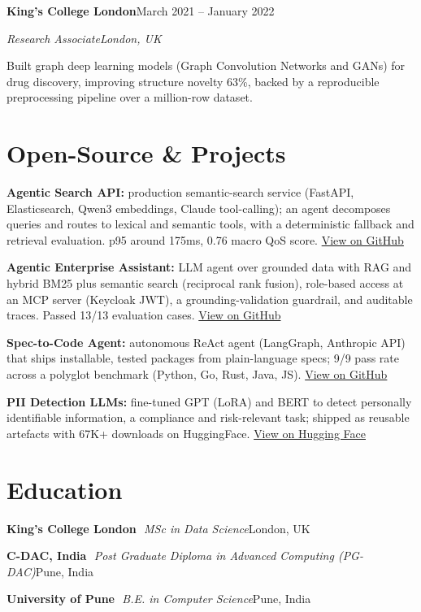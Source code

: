 \documentclass[10pt,a4paper]{article}
\newcommand{\entry}[4]{%
  {\color{company}\bfseries #1}\hfill {\color{muted}#2}\par
  \vspace{1pt}
  {\itshape #3}\hfill {\color{muted}\itshape #4}\par
  \vspace{3pt}%
}
\newcommand{\sep}{\,\textcolor{accent!60}{\textbar}\,}
\begin{document}
\entry{King's College London}{March 2021 -- January 2022}{Research Associate}{London, UK}
\begin{tight}
  \item Built graph deep learning models (Graph Convolution Networks and GANs) for drug discovery, improving structure novelty 63\%, backed by a reproducible preprocessing pipeline over a million-row dataset.
\end{tight}

\section{Open-Source \& Projects}
\begin{tight}
  \item \textbf{Agentic Search API:} production semantic-search service (FastAPI, Elasticsearch, Qwen3 embeddings, Claude tool-calling); an agent decomposes queries and routes to lexical and semantic tools, with a deterministic fallback and retrieval evaluation. p95 around 175ms, 0.76 macro QoS score. \href{https://github.com/abhijeetscode/search-agent}{View on GitHub}
  \item \textbf{Agentic Enterprise Assistant:} LLM agent over grounded data with RAG and hybrid BM25 plus semantic search (reciprocal rank fusion), role-based access at an MCP server (Keycloak JWT), a grounding-validation guardrail, and auditable traces. Passed 13/13 evaluation cases. \href{https://github.com/abhijeetscode/Agentic-Enterprise-Assistant}{View on GitHub}
  \item \textbf{Spec-to-Code Agent:} autonomous ReAct agent (LangGraph, Anthropic API) that ships installable, tested packages from plain-language specs; 9/9 pass rate across a polyglot benchmark (Python, Go, Rust, Java, JS). \href{https://github.com/abhijeetscode/Spec-to-Code-Agent}{View on GitHub}
  \item \textbf{PII Detection LLMs:} fine-tuned GPT (LoRA) and BERT to detect personally identifiable information, a compliance and risk-relevant task; shipped as reusable artefacts with 67K+ downloads on HuggingFace. \href{https://huggingface.co/ab-ai/pii_model}{View on Hugging Face}
\end{tight}

\section{Education}
{\color{company}\bfseries King's College London} \sep {\itshape MSc in Data Science}\hfill {\color{muted}London, UK}\par\vspace{1pt}
{\color{company}\bfseries C-DAC, India} \sep {\itshape Post Graduate Diploma in Advanced Computing (PG-DAC)}\hfill {\color{muted}Pune, India}\par\vspace{1pt}
{\color{company}\bfseries University of Pune} \sep {\itshape B.E. in Computer Science}\hfill {\color{muted}Pune, India}\par
\end{document}
